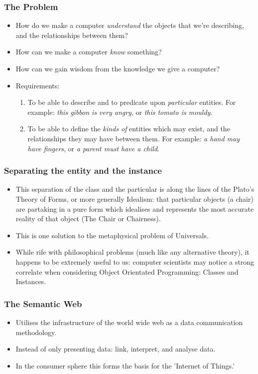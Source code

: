 \documentclass{beamer}
\begin{document}
\begin{frame}
\frametitle{The Problem}

\begin{itemize}
  \item How do we make a computer \emph{understand} the objects that we're describing,
  and the relationships between them?
  \item How can we make a computer \emph{know} something?
  \item How can we gain wisdom from the knowledge we give a computer?
  \item Requirements:
  \begin{enumerate}
    \item To be able to describe and to predicate upon \emph{particular}
    entities. For example: \emph{this gibbon is very angry}, or \emph{this tomato is
    mouldy}.
    \item To be able to define the \emph{kinds of} entities which may exist, and
    the relationships they may have between them. For example: \emph{a hand may have
    fingers}, or \emph{a parent must have a child}.
  \end{enumerate}
\end{itemize}
\end{frame}

\begin{frame}
\frametitle{Separating the entity and the instance}
 \begin{itemize}
  \item This separation of the class and the particular is along the lines of
  the Plato's Theory of Forms, or more generally Idealism: that particular
  objects (a chair) are partaking in a pure form which idealises and represents
  the most accurate reality of that object (The Chair or Chairness).
  \item This is one solution to the metaphysical problem of Universals.
  \item While rife with philosophical problems (much like any alternative
  theory), it happens to be extremely useful to us: computer scientists may
  notice a strong correlate when considering Object Orientated Programming:
  Classes and Instances.
\end{itemize}
\end{frame}

\begin{frame}
\frametitle{The Semantic Web}

\begin{itemize}
  \item Utilises the infrastructure of the world wide web as a data
  communication methodology.
  \item Instead of only presenting data: link, interpret, and analyse data.
  \item In the consumer sphere this forms the basis for the 'Internet of
  Things.' 
\end{itemize}
\end{frame}
\end{document}
